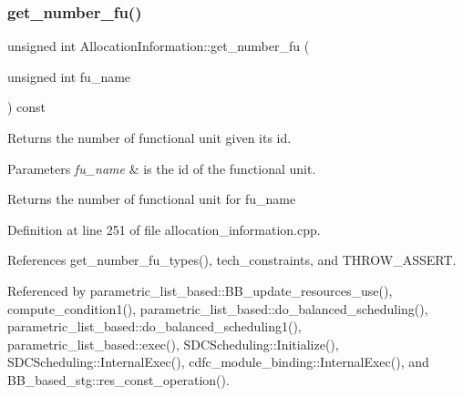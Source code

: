 \subsubsection{\texorpdfstring{get\+\_\+number\+\_\+fu()}{get\_number\_fu()}}
{\footnotesize\ttfamily unsigned int Allocation\+Information\+::get\+\_\+number\+\_\+fu (\begin{DoxyParamCaption}\item[{unsigned int}]{fu\+\_\+name }\end{DoxyParamCaption}) const}



Returns the number of functional unit given its id. 


\begin{DoxyParams}{Parameters}
{\em fu\+\_\+name} & is the id of the functional unit. \\
\hline
\end{DoxyParams}
\begin{DoxyReturn}{Returns}
the number of functional unit for fu\+\_\+name 
\end{DoxyReturn}


Definition at line 251 of file allocation\+\_\+information.\+cpp.



References get\+\_\+number\+\_\+fu\+\_\+types(), tech\+\_\+constraints, and T\+H\+R\+O\+W\+\_\+\+A\+S\+S\+E\+RT.



Referenced by parametric\+\_\+list\+\_\+based\+::\+B\+B\+\_\+update\+\_\+resources\+\_\+use(), compute\+\_\+condition1(), parametric\+\_\+list\+\_\+based\+::do\+\_\+balanced\+\_\+scheduling(), parametric\+\_\+list\+\_\+based\+::do\+\_\+balanced\+\_\+scheduling1(), parametric\+\_\+list\+\_\+based\+::exec(), S\+D\+C\+Scheduling\+::\+Initialize(), S\+D\+C\+Scheduling\+::\+Internal\+Exec(), cdfc\+\_\+module\+\_\+binding\+::\+Internal\+Exec(), and B\+B\+\_\+based\+\_\+stg\+::res\+\_\+const\+\_\+operation().

